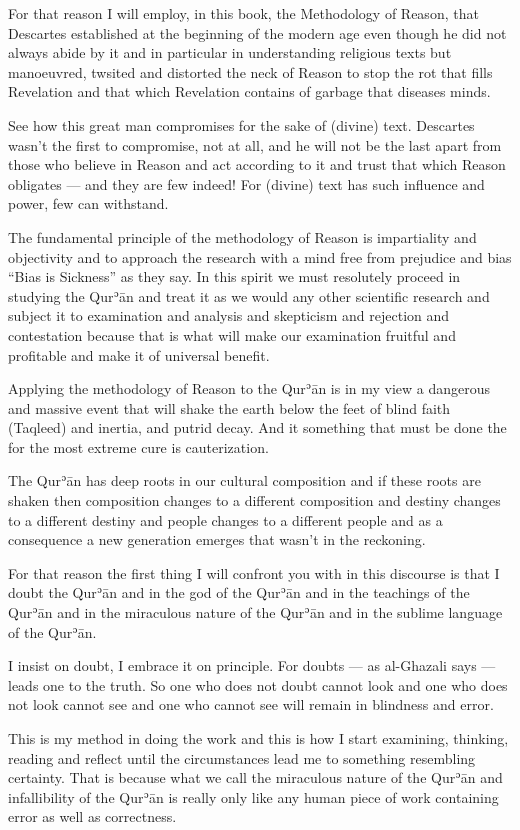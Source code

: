 \documentclass[12pt]{memoir}
\def\´{ʾ} %
\def \Quran{Qur\-\´ān} %
\let \Qrn=\Quran      %
\def\–{-\hskip0pt}
\begin{document}
For that reason I will employ, in this book, the Methodology of Reason, that
Descartes established at the beginning of the modern age even though he did not
always abide by it and in particular in understanding religious texts but
manoeuvred, twsited and distorted the neck of Reason to stop the rot that fills
Revelation and that which Revelation contains of garbage that diseases minds.

See how this great man compromises for the sake of (divine) text. Descartes
wasn’t the first to compromise, not at all, and he will not be the last apart
from those who believe in Reason and act according to it and trust that which
Reason obligates — and they are few indeed! For (divine) text has such
influence and power, few can withstand.

The fundamental principle of the methodology of Reason is impartiality and
objectivity and to approach the research with a mind free from prejudice and
bias “Bias is Sickness” as they say. In this spirit we must resolutely proceed
in studying the \Qrn{} and treat it as we would any other scientific research
and subject it to examination and analysis and skepticism and rejection and
contestation because that is what will make our examination fruitful and
profitable and make it of universal benefit.

Applying the methodology of Reason to the \Qrn{} is in my view a dangerous and
massive event that will shake the earth below the feet of blind faith (Taqleed)
and inertia, and putrid decay. And it something that must be done the for the
most extreme cure is cauterization.

The \Qrn{} has deep roots in our cultural composition and if these roots are
shaken then composition changes to a different composition and destiny changes
to a different destiny and people changes to a different people and as a
consequence a new generation emerges that wasn’t in the reckoning.

For that reason the first thing I will confront you with in this discourse is
that I doubt the \Qrn{} and in the god of the \Qrn{} and in the teachings of
the \Qrn{} and in the miraculous nature of the \Qrn{} and in the sublime
language of the \Quran.

I insist on doubt, I embrace it on principle.
For doubts — as al\–Ghazali says — leads one to the truth.
So one who does not doubt cannot look and one who does not look
cannot see and one who cannot see will remain in blindness and error.

This is my method in doing the work and this is how I start examining,
thinking, reading and reflect until the circumstances lead me to something
resembling certainty. That is because what we call the miraculous nature of the
\Qrn{} and infallibility of the \Qrn{} is really only like any human piece of
work containing error as well as correctness.
\end{document}
